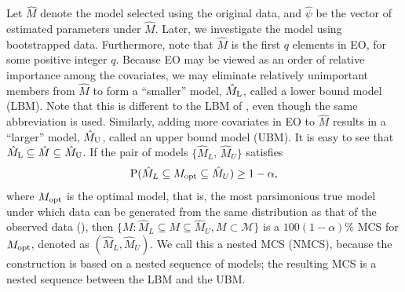 \documentclass[12pt]{article} %
\theoremstyle{definition}
\begin{document}
Let $\hat{M}$ denote the model selected using the original data, and $\hat{\psi}$ be the vector of estimated parameters under $\hat{M}$. Later, we investigate the model using bootstrapped data. Furthermore, note that $\hat{M}$ is the first $q$ elements in EO, for some positive integer $q$. Because EO may be viewed as an order of relative importance among the covariates, we may eliminate relatively unimportant members from $\hat{M}$ to form a ``smaller'' model, $\hat{M}_{\rm L}$, called a lower bound model (LBM). Note that this is different to the LBM of \citet{Ferrari2015}, even though the same abbreviation is used. Similarly, adding more covariates in EO to $\hat{M}$ results in a ``larger'' model, $\hat{M}_{\rm U}$, called an upper bound model (UBM). It is easy to see that $\hat{M}_{\rm L} \subseteq \hat{M} \subseteq \hat{M}_{\rm U}$. If the pair of models $\{\hat{M}_L$, $\hat{M}_U\}$ satisfies
\begin{align}
{\rm P}(\hat{M}_L \subseteq M_{\rm opt} \subseteq \hat{M}_U) \geq 1-\alpha,\label{NMCS}
\end{align}
where $M_{\rm opt}$ is the optimal model, that is, the most parsimonious true model under which data can be generated from the same distribution as that of the observed data (\citet{Liu2021}), then $\{M: \hat{M}_L \subseteq M \subseteq \hat{M}_U, M \subset \mathcal{M}\}$ is a $100(1-\alpha)\%$ MCS for $M_{\rm opt}$, denoted as $(\hat{M}_L, \hat{M}_U)$. We call this a nested MCS (NMCS), because the construction is based on a nested sequence of models; the resulting MCS is a nested sequence between the LBM and the UBM.
\end{document}
